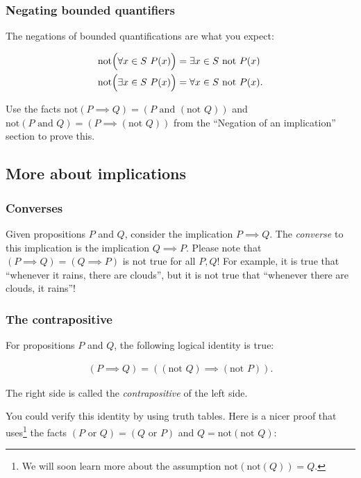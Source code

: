 \subsubsection*{Negating bounded quantifiers}

The negations of bounded quantifications are what you expect:

\begin{align*}
    &\text{not}\Big( \forall x \in S \text{ } P(x) \Big) = \exists x \in S \text{ } \text{not } P(x) \\
    &\text{not}\Big( \exists x \in S \text{ } P(x) \Big) = \forall x \in S \text{ } \text{not } P(x).
\end{align*}

Use the facts $\text{not}(P \implies Q) = (P \text{ and } (\text{not } Q))$ and $\text{not}(P \text{ and } Q) = (P \implies (\text{not } Q))$ from the ``Negation of an implication'' section to prove this.

\newpage

\subsection*{More about implications}

\subsubsection*{Converses}

Given propositions $P$ and $Q$, consider the implication $P \implies Q$. The \textit{converse} to this implication is the implication $Q \implies P$. Please note that $(P \implies Q) = (Q \implies P)$ is not true for all $P, Q$! For example, it is true that ``whenever it rains, there are clouds'', but it is not true that ``whenever there are clouds, it rains''!

\subsubsection*{The contrapositive}

For propositions $P$ and $Q$, the following logical identity is true:

\begin{align*}
    (P \implies Q) = ((\text{not } Q) \implies (\text{not } P)).
\end{align*}

The right side is called the \textit{contrapositive} of the left side.

You could verify this identity by using truth tables. Here is a nicer proof that uses\footnote{We will soon learn more about the assumption $\text{not}(\text{not}(Q)) = Q$.} the facts $(P \text{ or } Q) = (Q \text{ or } P)$ and $Q = \text{not}(\text{not } Q)$:

